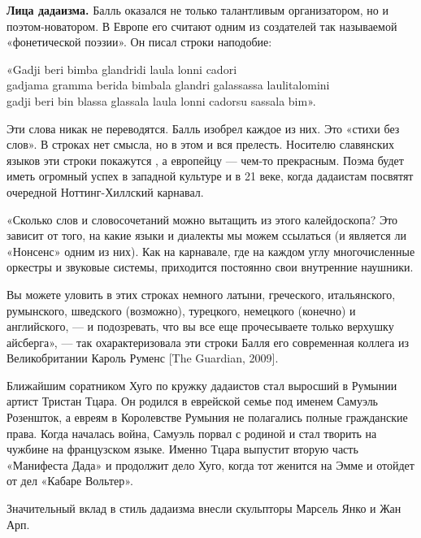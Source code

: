 \textbf{Лица дадаизма.} Балль оказался не только талантливым организатором, но и поэтом-новатором. В Европе его считают одним из создателей так называемой «фонетической поэзии». Он писал строки наподобие:

\begin{fancyquotes}
    «Gadji beri bimba glandridi laula lonni cadori\\
    gadjama gramma berida bimbala glandri galassassa laulitalomini\\
    gadji beri bin blassa glassala laula lonni cadorsu sassala bim».
\end{fancyquotes}


Эти слова никак не переводятся. Балль изобрел каждое из них. Это «стихи без слов». В строках нет смысла, но в этом и вся прелесть. Носителю славянских языков эти строки покажутся , а европейцу --- чем-то прекрасным. Поэма будет иметь огромный успех в западной культуре и в 21 веке, когда дадаистам посвятят очередной Ноттинг-Хиллский карнавал.

«Сколько слов и словосочетаний можно вытащить из этого калейдоскопа? Это зависит от того, на какие языки и диалекты мы можем ссылаться (и является ли «Нонсенс» одним из них). Как на карнавале, где на каждом углу  многочисленные оркестры и звуковые системы,  приходится постоянно  свои внутренние наушники.

Вы можете уловить в этих строках немного латыни, греческого, итальянского, румынского, шведского (возможно), турецкого, немецкого (конечно) и английского, --- и подозревать, что вы все еще прочесываете только верхушку айсберга», --- так охарактеризовала эти строки Балля его современная коллега из Великобритании Кароль Руменс [The Guardian, 2009].

Ближайшим соратником Хуго по кружку дадаистов стал выросший в Румынии артист Тристан Тцара. Он родился в еврейской семье под именем Самуэль Розеншток, а евреям в Королевстве Румыния не полагались полные гражданские права. Когда началась война, Самуэль порвал с родиной и стал творить на чужбине на французском языке. Именно Тцара выпустит вторую часть «Манифеста Дада» и продолжит дело Хуго, когда тот женится на Эмме и отойдет от дел «Кабаре Вольтер».

Значительный вклад в стиль дадаизма внесли скульпторы Марсель Янко и Жан Арп.

